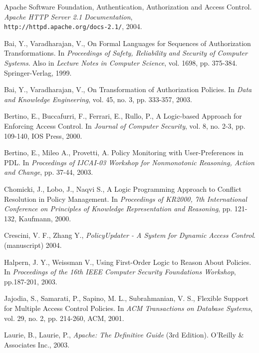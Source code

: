 \documentclass[11pt, twocolumn]{article}
\begin{document}
  \begin{thebibliography}{5}
      Apache Software Foundation,
      Authentication, Authorization and Access Control.
      {\em Apache HTTP Server 2.1 Documentation}, \\
      {\scriptsize \tt http://httpd.apache.org/docs-2.1/}, 2004.

      Bai, Y., Varadharajan, V.,
      On Formal Languages for Sequences of Authorization Transformations.
      In {\em Proceedings of Safety, Reliability and Security of Computer
      Systems}. Also in {\em Lecture Notes in Computer Science},
      vol. 1698, pp. 375-384. Springer-Verlag, 1999.

      Bai, Y., Varadharajan, V.,
      On Transformation of Authorization Policies.
      In {\em Data and Knowledge Engineering},
      vol. 45, no. 3, pp. 333-357, 2003.

      Bertino, E., Buccafurri, F., Ferrari, E., Rullo, P.,
      A Logic-based Approach for Enforcing Access Control.
      In {\em Journal of Computer Security},
      vol. 8, no. 2-3, pp. 109-140, IOS Press, 2000.

      Bertino, E., Mileo A., Provetti, A.
      Policy Monitoring with User-Preferences in PDL.
      In {\em Proceedings of IJCAI-03 Workshop for Nonmonotonic Reasoning,
      Action and Change},
      pp. 37-44, 2003.

      Chomicki, J., Lobo, J., Naqvi S.,
      A Logic Programming Approach to Conflict Resolution in Policy Management.
      In {\em Proceedings of KR2000, 7th International Conference on Principles
      of Knowledge Representation and Reasoning},
      pp. 121-132, Kaufmann, 2000.

      Crescini, V. F., Zhang Y.,
      {\em PolicyUpdater - A System for Dynamic Access Control}.
      (manuscript) 2004.

      Halpern, J. Y., Weissman V.,
      Using First-Order Logic to Reason About Policies.
      In {\em Proceedings of the 16th IEEE Computer Security Foundations
      Workshop}, pp.187-201, 2003.

      Jajodia, S., Samarati, P., Sapino, M. L., Subrahmanian, V. S.,
      Flexible Support for Multiple Access Control Policies.
      In {\em ACM Transactions on Database Systems},
      vol. 29, no. 2, pp. 214-260, ACM, 2001.

      Laurie, B., Laurie, P.,
      {\em Apache: The Definitive Guide} (3rd Edition).
      O'Reilly \& Associates Inc., 2003.


\end{thebibliography}
\end{document}
